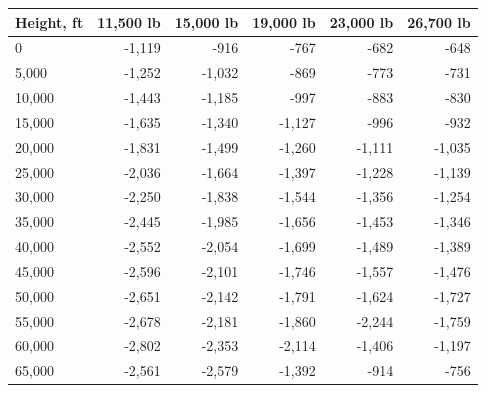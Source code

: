 \begin{tabular}{@{}lrrrrr@{}}
\toprule
Height, ft & 11,500 lb & 15,000 lb & 19,000 lb & 23,000 lb & 26,700 lb \\
\midrule
0 & -1,119 & -916 & -767 & -682 & -648 \\
5,000 & -1,252 & -1,032 & -869 & -773 & -731 \\
10,000 & -1,443 & -1,185 & -997 & -883 & -830 \\
15,000 & -1,635 & -1,340 & -1,127 & -996 & -932 \\
20,000 & -1,831 & -1,499 & -1,260 & -1,111 & -1,035 \\
25,000 & -2,036 & -1,664 & -1,397 & -1,228 & -1,139 \\
30,000 & -2,250 & -1,838 & -1,544 & -1,356 & -1,254 \\
35,000 & -2,445 & -1,985 & -1,656 & -1,453 & -1,346 \\
40,000 & -2,552 & -2,054 & -1,699 & -1,489 & -1,389 \\
45,000 & -2,596 & -2,101 & -1,746 & -1,557 & -1,476 \\
50,000 & -2,651 & -2,142 & -1,791 & -1,624 & -1,727 \\
55,000 & -2,678 & -2,181 & -1,860 & -2,244 & -1,759 \\
60,000 & -2,802 & -2,353 & -2,114 & -1,406 & -1,197 \\
65,000 & -2,561 & -2,579 & -1,392 & -914 & -756 \\
\bottomrule
\end{tabular}
